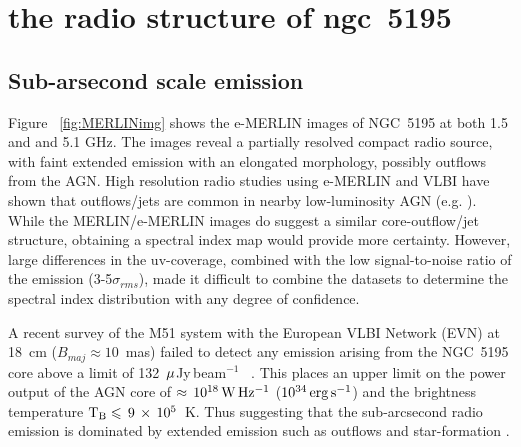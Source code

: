 \documentclass[fleqn,usenatbib]{mnras}
\def\Fig{Figure}
\def\mujybm   {${\rm \mu}$Jy\,beam$^{-1}$}
\begin{document}
\section{the radio structure of ngc~5195}

\subsection{Sub-arsecond scale emission}

\Fig~ \ref{fig:MERLINimg} shows the e-MERLIN images of NGC~5195 at both 1.5 and  and 5.1 GHz. The images reveal a partially resolved compact radio source, with faint extended emission with an elongated morphology, possibly outflows from the AGN. High resolution radio studies using e-MERLIN and VLBI have shown that outflows/jets are common in nearby low-luminosity AGN (e.g. \citealt{Krips+2007,GP09}). While the MERLIN/e-MERLIN images do suggest a similar core-outflow/jet structure, obtaining a spectral index map would provide more certainty. However, large differences in the uv-coverage, combined with the low signal-to-noise ratio of the emission (3-5$\sigma_{rms}$), made it difficult to combine the datasets to determine the spectral index distribution with any degree of confidence. 

A recent survey of the M51 system with the European 
VLBI Network (EVN) at 18~cm ($B_{maj} \approx 10$~mas) failed to detect any emission arising from the 
NGC~5195 core above a limit of 132~\mujybm~ \citep{Rampadarathetal15}. This places an upper limit on 
the power output of the AGN core of $\approx\,10^{18}\,{\rm W\,Hz^{-1}}$ ($10^{34}\,{\rm 
erg\,s^{-1}}$) and the brightness temperature ${\rm T_{B}}\leq\,9\,\times\,10^{5}$~K. Thus suggesting 
that the sub-arcsecond radio emission is dominated by extended emission such as outflows and star-formation \citep{Padovani2016}.
\end{document}
